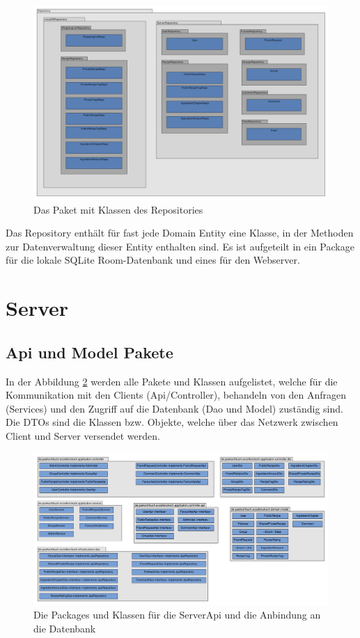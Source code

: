 \begin{figure}[H]
	\centering
	\includegraphics[width=\textwidth]{generatedpics/RepositoryPackage.pdf}%
	\caption{Das Paket mit Klassen des Repositories}%
	\label{repo}%
\end{figure}

Das Repository enthält für fast jede Domain Entity eine Klasse, in der Methoden zur Datenverwaltung dieser Entity enthalten sind. Es ist aufgeteilt in ein Package für die lokale SQLite Room-Datenbank und eines für den Webserver.

\section{Server}

\subsection{Api und Model Pakete}

In der Abbildung \ref{serverapidb} werden alle Pakete und Klassen aufgelistet, welche für die Kommunikation mit den Clients (Api/Controller), behandeln von den Anfragen (Services) und den Zugriff auf die Datenbank (Dao und Model) zuständig sind. Die DTOs sind die Klassen bzw. Objekte, welche über das Netzwerk zwischen Client und Server versendet werden.

\begin{figure}[H]
	\centering
	\includegraphics[width=\textwidth]{pics/PacketServerApi_and_Db.pdf}%
	\caption{Die Packages und Klassen für die ServerApi und die Anbindung an die Datenbank}%
	\label{serverapidb}
\end{figure}

